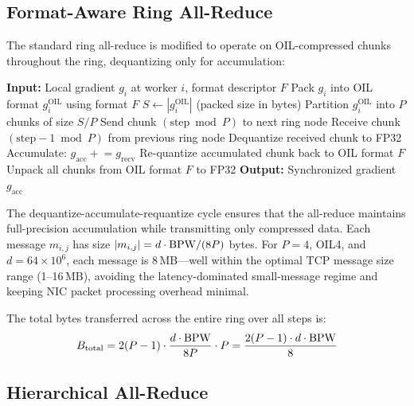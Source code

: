 \subsection{Format-Aware Ring All-Reduce}
\label{sec:format_aware_ring}

The standard ring all-reduce is modified to operate on OIL-compressed chunks throughout the ring, dequantizing only for accumulation:

\begin{algorithm}[H]
\caption{Format-Aware Ring All-Reduce}
\label{alg:ring_allreduce}
\begin{algorithmic}[1]
\STATE \textbf{Input:} Local gradient $g_i$ at worker $i$, format descriptor $F$
\STATE Pack $g_i$ into OIL format $g_i^{\text{OIL}}$ using format $F$
\STATE $S \leftarrow |g_i^{\text{OIL}}|$ (packed size in bytes)
\STATE Partition $g_i^{\text{OIL}}$ into $P$ chunks of size $S/P$
    \STATE Send chunk $(\text{step} \bmod P)$ to next ring node
    \STATE Receive chunk $(\text{step} - 1 \bmod P)$ from previous ring node
    \STATE Dequantize received chunk to FP32
    \STATE Accumulate: $g_{\text{acc}} \mathrel{+}= g_{\text{recv}}$
    \STATE Re-quantize accumulated chunk back to OIL format $F$
\ENDFOR
\STATE Unpack all chunks from OIL format $F$ to FP32
\STATE \textbf{Output:} Synchronized gradient $g_{\text{acc}}$
\end{algorithmic}
\end{algorithm}

The dequantize-accumulate-requantize cycle ensures that the all-reduce maintains full-precision accumulation while transmitting only compressed data. Each message $m_{i,j}$ has size $|m_{i,j}| = d \cdot \textnormal{BPW} / (8P)$ bytes. For $P = 4$, OIL4, and $d = 64 \times 10^6$, each message is 8\,MB---well within the optimal TCP message size range (1--16\,MB), avoiding the latency-dominated small-message regime and keeping NIC packet processing overhead minimal.

The total bytes transferred across the entire ring over all steps is:
\[
B_{\text{total}} = 2(P-1) \cdot \frac{d \cdot \textnormal{BPW}}{8P} \cdot P = \frac{2(P-1) \cdot d \cdot \textnormal{BPW}}{8}
\]

\subsection{Hierarchical All-Reduce}
\label{sec:hierarchical_allreduce}

